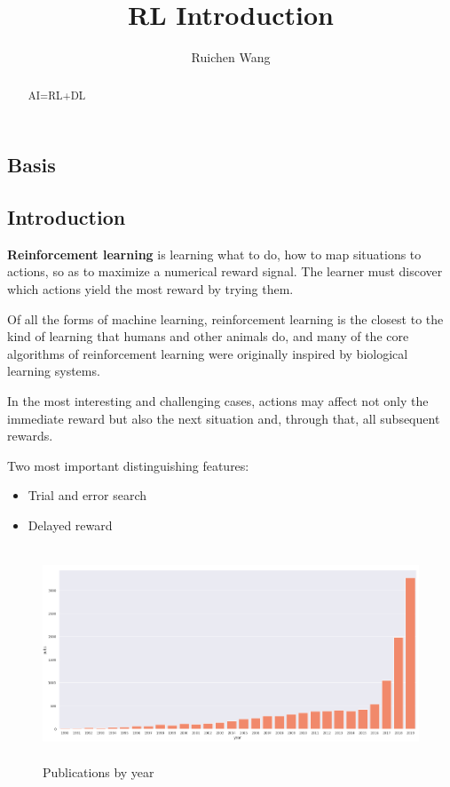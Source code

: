 \documentclass{article}
\author{Ruichen Wang}
\title{RL Introduction}
\begin{document}
\begin{CJK*}{UTF8}{gbsn}
\maketitle
\begin{abstract}
AI=RL+DL
\end{abstract}

\tableofcontents

\section{Basis}
\subsection{Introduction}
\textbf{Reinforcement learning} is learning what to do, how to map situations to actions, so
as to maximize a numerical reward signal. The learner must discover which actions yield the most reward by trying them. 

Of all the
forms of machine learning, reinforcement learning is the closest to the kind of learning
that humans and other animals do, and many of the core algorithms of reinforcement
learning were originally inspired by biological learning systems.

In the most interesting and challenging cases, actions may affect not only the immediate reward but also the next situation and, through that, all subsequent rewards.

Two most important distinguishing features:
\begin{itemize}
\item Trial and error search
\item Delayed reward
\end{itemize}

\begin{figure}[H]
\centering
\includegraphics[width=6in,height=2.5in]{pub}
\caption{Publications by year}
\end{figure}


\end{CJK*}
\end{document}
